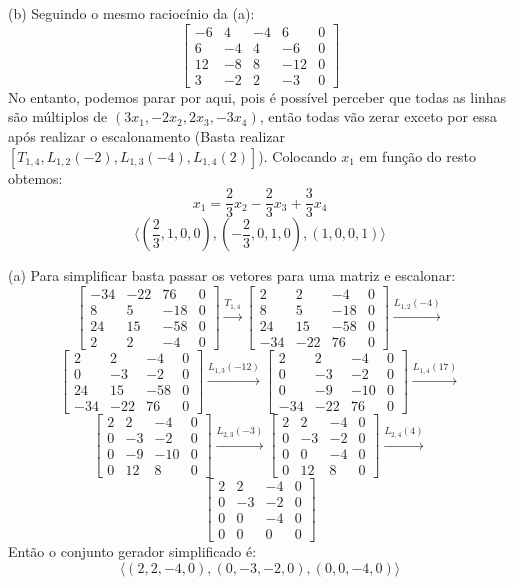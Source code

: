 \documentclass{homework}
\begin{document}
(b) Seguindo o mesmo raciocínio da (a):
\[
\left[ \begin{array}{cccc|c}
-6 & 4 & -4 & 6 & 0\\
6 & -4 & 4 & -6 & 0\\
12 & -8 & 8 & -12 & 0\\
3 & -2 & 2 & -3 & 0
\end{array} \right]
\]
No entanto, podemos parar por aqui, pois é possível perceber que todas as linhas são múltiplos de $(3x_1,-2x_2,2x_3,-3x_4)$, então todas vão zerar exceto por essa após realizar o escalonamento (Basta realizar $[T_{1,4},L_{1,2}(-2),L_{1,3}(-4),L_{1,4}(2)]$). Colocando $x_1$ em função do resto obtemos:
\[x_1 = \frac{2}{3}x_2 - \frac{2}{3}x_3 + \frac{3}{3}x_4\]
\[\langle(\frac{2}{3},1,0,0),(-\frac{2}{3},0,1,0),(1,0,0,1)\rangle\]


\exercise*
(a) Para simplificar basta passar os vetores para uma matriz e escalonar:
\[
\begin{bmatrix}
-34 & -22 & 76 & 0\\
8 & 5 & -18 & 0\\
24 & 15 & -58 & 0\\
2 & 2 & -4 & 0
\end{bmatrix} \xrightarrow{T_{1,4}}
\begin{bmatrix}
2 & 2 & -4 & 0 \\
8 & 5 & -18 & 0\\
24 & 15 & -58 & 0\\
-34 & -22 & 76 & 0
\end{bmatrix} \xrightarrow{L_{1,2}(-4)}
\]
\[
\begin{bmatrix}
2 & 2 & -4 & 0 \\
0 & -3 & -2 & 0\\
24 & 15 & -58 & 0\\
-34 & -22 & 76 & 0
\end{bmatrix} \xrightarrow{L_{1,3}(-12)}
\begin{bmatrix}
2 & 2 & -4 & 0 \\
0 & -3 & -2 & 0\\
0 & -9 & -10 & 0\\
-34 & -22 & 76 & 0
\end{bmatrix} \xrightarrow{L_{1,4}(17)}
\]
\[
\begin{bmatrix}
2 & 2 & -4 & 0 \\
0 & -3 & -2 & 0\\
0 & -9 & -10 & 0\\
0 & 12 & 8 & 0
\end{bmatrix} \xrightarrow{L_{2,3}(-3)}
\begin{bmatrix}
2 & 2 & -4 & 0 \\
0 & -3 & -2 & 0\\
0 & 0 & -4 & 0\\
0 & 12 & 8 & 0
\end{bmatrix} \xrightarrow{L_{2,4}(4)}
\]
\[
\begin{bmatrix}
2 & 2 & -4 & 0 \\
0 & -3 & -2 & 0\\
0 & 0 & -4 & 0\\
0 & 0 & 0 & 0
\end{bmatrix}
\]
Então o conjunto gerador simplificado é:
\[\langle(2,2,-4,0),(0,-3,-2,0),(0,0,-4,0)\rangle\]
\end{document}
